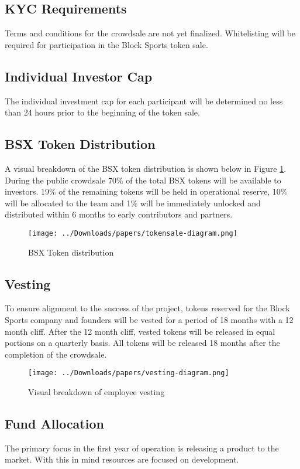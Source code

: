 \documentclass{article}
\begin{document}
	\subsection{KYC Requirements}
Terms and conditions for the crowdsale are not yet finalized. Whitelisting will be required for participation in the Block Sports token sale.

	\subsection{Individual Investor Cap}
The individual investment cap for each participant will be determined no less than 24 hours prior to the beginning of the token sale. 
	
	\subsection{BSX Token Distribution}
A visual breakdown of the BSX token distribution is shown below in Figure \ref{figure:distribution}. During the public crowdsale 70\% of the total BSX tokens will be available to investors. 19\% of the remaining tokens will be held in operational reserve, 10\% will be allocated to the team and 1\% will be immediately unlocked and distributed within 6 months to early contributors and partners.

\begin{figure}[!htb]
\centering
\texttt{[image: ../Downloads/papers/tokensale-diagram.png]} 
\caption{BSX Token distribution}
\label{figure:distribution}
\end{figure}

	\subsection{Vesting}
To ensure alignment to the success of the project, tokens reserved for the Block Sports company and founders will be vested for a period of 18 months with a 12 month cliff. After the 12 month cliff, vested tokens will be released in equal portions on a quarterly basis. All tokens will be released 18 months after the completion of the crowdsale. 

\begin{figure}[!htb]
\centering
\texttt{[image: ../Downloads/papers/vesting-diagram.png]} 
\caption{Visual breakdown of employee vesting}
\label{figure:vesting}
\end{figure}
	

	\subsection{Fund Allocation}
The primary focus in the first year of operation is releasing a product to the market. With this in mind resources are focused on development.
\end{document}
